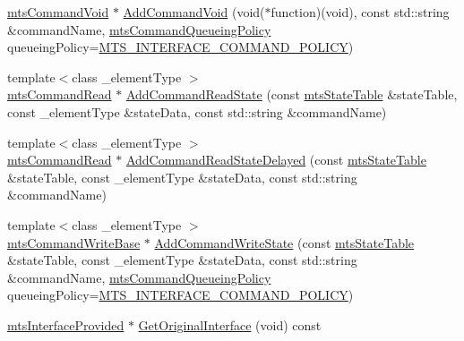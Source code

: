 \begin{DoxyCompactItemize}
\item 
\hyperlink{classmts_command_void}{mts\+Command\+Void} $\ast$ \hyperlink{classmts_interface_provided_a224ba8ebb6bf7ad3cf8836602c333844}{Add\+Command\+Void} (void($\ast$function)(void), const std\+::string \&command\+Name, \hyperlink{mts_forward_declarations_8h_aa2ac24035e136fa1689dcc2854c63fc7}{mts\+Command\+Queueing\+Policy} queueing\+Policy=\hyperlink{mts_forward_declarations_8h_aa2ac24035e136fa1689dcc2854c63fc7a4f444b4120a5e2efd084e2e5a214f5c8}{M\+T\+S\+\_\+\+I\+N\+T\+E\+R\+F\+A\+C\+E\+\_\+\+C\+O\+M\+M\+A\+N\+D\+\_\+\+P\+O\+L\+I\+C\+Y})
\item 
{\footnotesize template$<$class \+\_\+element\+Type $>$ }\\\hyperlink{classmts_command_read}{mts\+Command\+Read} $\ast$ \hyperlink{classmts_interface_provided_a6787568d03845678e7edff0609ff23b6}{Add\+Command\+Read\+State} (const \hyperlink{classmts_state_table}{mts\+State\+Table} \&state\+Table, const \+\_\+element\+Type \&state\+Data, const std\+::string \&command\+Name)
\item 
{\footnotesize template$<$class \+\_\+element\+Type $>$ }\\\hyperlink{classmts_command_read}{mts\+Command\+Read} $\ast$ \hyperlink{classmts_interface_provided_af576c4316302019d7fbb8b4f3d5da48d}{Add\+Command\+Read\+State\+Delayed} (const \hyperlink{classmts_state_table}{mts\+State\+Table} \&state\+Table, const \+\_\+element\+Type \&state\+Data, const std\+::string \&command\+Name)
\item 
{\footnotesize template$<$class \+\_\+element\+Type $>$ }\\\hyperlink{classmts_command_write_base}{mts\+Command\+Write\+Base} $\ast$ \hyperlink{classmts_interface_provided_ae415090b8ecf1ad0311c532c00b37f1a}{Add\+Command\+Write\+State} (const \hyperlink{classmts_state_table}{mts\+State\+Table} \&state\+Table, const \+\_\+element\+Type \&state\+Data, const std\+::string \&command\+Name, \hyperlink{mts_forward_declarations_8h_aa2ac24035e136fa1689dcc2854c63fc7}{mts\+Command\+Queueing\+Policy} queueing\+Policy=\hyperlink{mts_forward_declarations_8h_aa2ac24035e136fa1689dcc2854c63fc7a4f444b4120a5e2efd084e2e5a214f5c8}{M\+T\+S\+\_\+\+I\+N\+T\+E\+R\+F\+A\+C\+E\+\_\+\+C\+O\+M\+M\+A\+N\+D\+\_\+\+P\+O\+L\+I\+C\+Y})
\item 
\hyperlink{classmts_interface_provided}{mts\+Interface\+Provided} $\ast$ \hyperlink{classmts_interface_provided_abf0474e52ed990b26e066cdd8389d2ce}{Get\+Original\+Interface} (void) const 
\item 

\end{DoxyCompactItemize}
